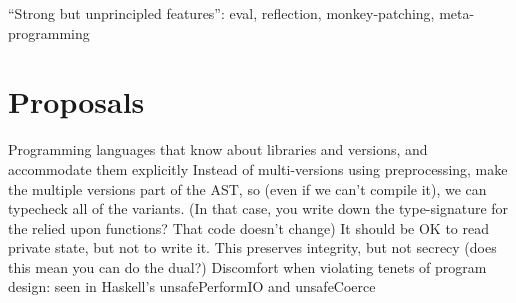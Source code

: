 \documentclass{sigplanconf}
\begin{document}
“Strong but unprincipled features”: eval, reflection, monkey-patching, meta-programming

\section{Proposals}

Programming languages that know about libraries and versions, and accommodate them explicitly
	Instead of multi-versions using preprocessing, make the multiple versions part of the AST, so (even if we can't compile it), we can typecheck all of the variants. (In that case, you write down the type-signature for the relied upon functions? That code doesn't change)
It should be OK to read private state, but not to write it.
	This preserves integrity, but not secrecy (does this mean you can do the dual?)
Discomfort when violating tenets of program design: seen in Haskell's unsafePerformIO and unsafeCoerce











\end{document}
